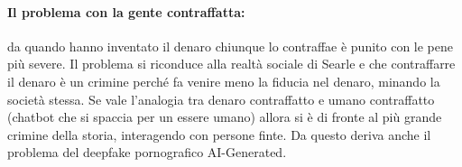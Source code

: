 \paragraph{Il problema con la gente contraffatta:} da quando hanno inventato il denaro chiunque lo contraffae è punito con le pene più severe. Il problema si riconduce alla realtà sociale di Searle e che contraffarre il denaro è un crimine perché fa venire meno la fiducia nel denaro, minando la società stessa. Se vale l'analogia tra denaro contraffatto e umano contraffatto (chatbot che si spaccia per un essere umano) allora si è di fronte al più grande crimine della storia, interagendo con persone finte. Da questo deriva anche il problema del deepfake pornografico AI-Generated. 




